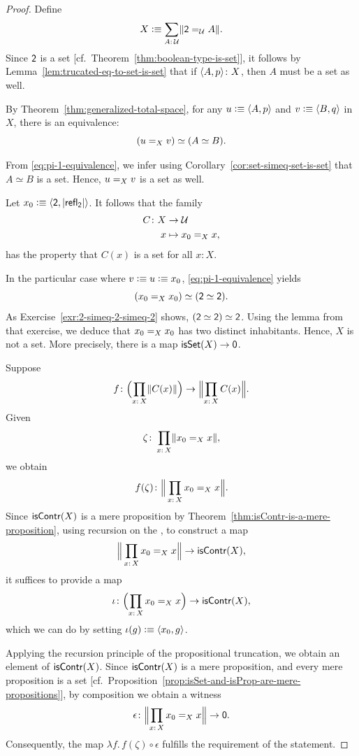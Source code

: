 \begin{proof}
    Define
    \[
        X\defeq\sum_{A\colon\univ}\lVert\fun2\eq{\univ}A\rVert.
    \]
    Since $\mathsf{2}$ is a set [cf.~Theorem~\ref{thm:boolean-type-is-set}], it follows by Lemma~\ref{lem:trucated-eq-to-set-is-set} that if $\dep{A,p}\colon X$, then $A$ must be a set as well.
    
    By Theorem~\ref{thm:generalized-total-space}, for any $u\mathrel{\vcentcolon}\equiv\langle A,p\rangle$ and $v\mathrel{\vcentcolon}\equiv\langle B,q\rangle$ in $X$, there is an equivalence:
    \begin{equation}\label{eq:pi-1-equivalence}
        (u\mathrel{=_{X}}v)\simeq(A\simeq B).
    \end{equation}
    
    From \eqref{eq:pi-1-equivalence}, we infer using Corollary~\ref{cor:set-simeq-set-is-set} that $A\simeq B$ is a set. Hence, $u\mathrel{=_{X}}v$ is a set as well.
    
    Let $x_0\mathrel{\vcentcolon}\equiv\langle\mathsf{2},\lvert\mathsf{refl}_{\mathsf{2}}\rvert\rangle$. It follows that the family 
    \begin{align*}
        C\colon X&\to\univ\\
        x&\mapsto x_0\eq Xx, 
    \end{align*}
    has the property that $C(x)$ is a set for all $x\colon X$.
    
    In the particular case where $v\mathrel{\vcentcolon}\equiv u\mathrel{\vcentcolon}\equiv x_0$, \eqref{eq:pi-1-equivalence} yields
    \[
        (x_0\mathrel{=_{X}}x_0)\simeq(\mathsf{2}\simeq\mathsf{2}).
    \]
    As Exercise~\ref{exr:2-simeq-2-simeq-2} shows, $(\mathsf{2}\simeq\mathsf{2})\simeq\mathsf{2}$. Using the lemma from that exercise, we deduce that $x_0\mathrel{=_{X}}x_0$ has two distinct inhabitants. Hence, $X$ is not a set. More precisely, there is a map $\mathsf{isSet}(X)\to\mathsf{0}$.

    Suppose
    \[
        f\colon
            \Bigl(\prod_{x\colon X}\lVert C(x)\rVert\Bigr)
            \to
            \Bigl\lVert\prod_{x\colon X}C(x)\Bigr\rVert.
    \]
    Given
    \[
        \zeta\colon\prod_{x\colon X}\lVert x_0\eq Xx\rVert,
    \]
    we obtain
    \[
        f(\zeta)\colon\Big\lVert\prod_{x\colon X}x_0\eq Xx\Bigr\rVert.
    \]
    Since $\mathsf{isContr}(X)$ is a mere proposition by Theorem~\ref{thm:isContr-is-a-mere-proposition}, using recursion on the \rhs, to construct a map
    \[
        \Big\lVert\prod_{x\colon X}x_0\eq Xx\Bigr\rVert\to\fun{isContr}(X),
    \]
    it suffices to provide a map
    \[
        \iota\colon\Bigl(\prod_{x\colon X}x_0\eq Xx\Bigr)\to\fun{isContr}(X),
    \]
    which we can do by setting $\iota(g)\mathrel{\vcentcolon}\equiv\langle x_0,g\rangle$.

    Applying the recursion principle of the propositional truncation, we obtain an element of $\mathsf{isContr}(X)$. Since $\mathsf{isContr}(X)$ is a mere proposition, and every mere proposition is a set [cf.~Proposition~\ref{prop:isSet-and-isProp-are-mere-propositions}], by composition we obtain a witness
    \[
        \epsilon\colon\Bigl\lVert\prod_{x\colon X}x_0\eq Xx\Bigr\rVert\to\fun0.
    \]
    Consequently, the map $\lambda f.\,f(\zeta)\circ\epsilon$ fulfills the requirement of the statement.
    
\end{proof}

